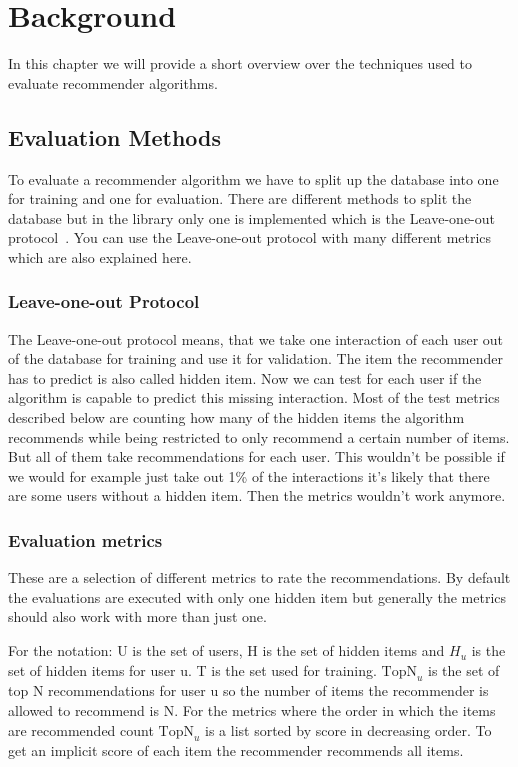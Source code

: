 
\chapter{Background}
In this chapter we will provide a short overview over the techniques
used to evaluate recommender algorithms.


\section{Evaluation Methods}

To evaluate a recommender algorithm we have to split up the database
into one for training and one for evaluation. There are different
methods to split the database but in the library only one is implemented
which is the Leave-one-out protocol~\cite{leaveoneout}.
You can use the Leave-one-out protocol with many different metrics
which are also explained here.


\subsection{Leave-one-out Protocol}
\label{leaveoneout}

The Leave-one-out protocol means, that we take one interaction of
each user out of the database for training and use it for validation.
The item the recommender has to predict is also called hidden item. 
Now we can test for each user if the algorithm is capable to predict
this missing interaction. Most of the test metrics described below are counting
how many of the hidden items the algorithm recommends while being
restricted to only recommend a certain number of items. But all
of them take recommendations for each user. This wouldn't be possible
if we would for example just take out 1\% of the interactions it's
likely that there are some users without a hidden item. Then the metrics
wouldn't work anymore.



\subsection{Evaluation metrics}
\label{evaluationmetrics}

These are a selection of different metrics to rate the recommendations.
By default the evaluations are executed with only one hidden item
but generally the metrics should also work with more than just one.

For the notation: U is the set of users, H is the set of hidden items
and \(H_u\) is the set of hidden items for user u. T is the set used for 
training. \(\text{TopN}_u\)
is the set of top N recommendations for user u so the number of items
the recommender is allowed to recommend is N. For the metrics where
the order in which the items are recommended count \(\text{TopN}_u\)
is a list sorted by score in decreasing order.
To get an implicit score of each item the recommender recommends all
items.


